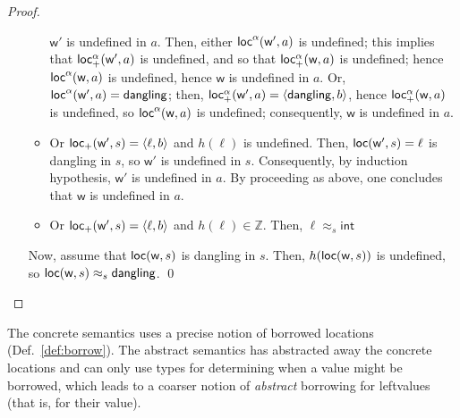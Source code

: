 \begin{proof}
\begin{itemize}
\begin{itemize}
      $\mathsf{w}'$ is undefined in $a$. Then, either $\mathsf{loc}^\alpha(\mathsf{w'},a)$ is
      undefined; this implies that $\mathsf{loc_+^\alpha}(\mathsf{w'},a)$ is undefined, and
      so that $\mathsf{loc_+^\alpha}(\mathsf{w},a)$ is undefined; hence
      $\mathsf{loc}^\alpha(\mathsf{w},a)$ is undefined, hence $\mathsf{w}$ is undefined in $a$.
      Or, $\mathsf{loc}^\alpha(\mathsf{w'},a)=\mathsf{dangling}$; then,
      $\mathsf{loc_+^\alpha}(\mathsf{w'},a)=\langle\mathsf{dangling},b\rangle$, hence
      $\mathsf{loc_+^\alpha}(\mathsf{w},a)$ is undefined, so $\mathsf{loc}^\alpha(\mathsf{w},a)$ is
      undefined; consequently, $\mathsf{w}$ is undefined in $a$.
      \item Or $\mathsf{loc_+}(\mathsf{w'},s)=\langle\ell,b\rangle$ and
      $h(\ell)$ is undefined. Then, $\mathsf{loc}(\mathsf{w'},s)=\ell$ is dangling
      in $s$, so $\mathsf{w'}$ is undefined in $s$. Consequently, by induction
      hypothesis, $\mathsf{w}'$ is undefined in $a$. By proceeding as above,
      one concludes that $\mathsf{w}$ is undefined in $a$.
      \item Or $\mathsf{loc_+}(\mathsf{w'},s)=\langle\ell,b\rangle$ and
      $h(\ell)\in\mathbb{Z}$. Then, $\ell \approx_s \mathsf{int}$
    \end{itemize}
    Now, assume that $\mathsf{loc}(\mathsf{w},s)$ is dangling in $s$. Then,
    $h(\mathsf{loc}(\mathsf{w},s))$ is undefined, so
    $\mathsf{loc}(\mathsf{w},s) \approx_s \mathsf{dangling}$.
    \qed
  \end{itemize}
\end{proof}

The concrete semantics uses a precise notion of borrowed locations
(Def.~\ref{def:borrow}). The abstract semantics has abstracted away the concrete locations
and can only use types for determining when a value might be borrowed, which leads
to a coarser notion of \emph{abstract} borrowing for leftvalues (that is, for their value).


